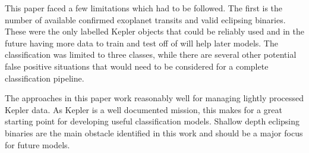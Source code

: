 This paper faced a few limitations which had to be followed. The first is the number of available confirmed exoplanet transits and valid eclipsing binaries. These were the only labelled Kepler objects that could be reliably used and in the future having more data to train and test off of will help later models. The classification was limited to three classes, while there are several other potential false positive situations that would need to be considered for a complete classification pipeline. 

The approaches in this paper work reasonably well for managing lightly processed Kepler data. As Kepler is a well documented mission, this makes for a great starting point for developing useful classification models. Shallow depth eclipsing binaries are the main obstacle identified in this work and should be a major focus for future models.

\newpage

